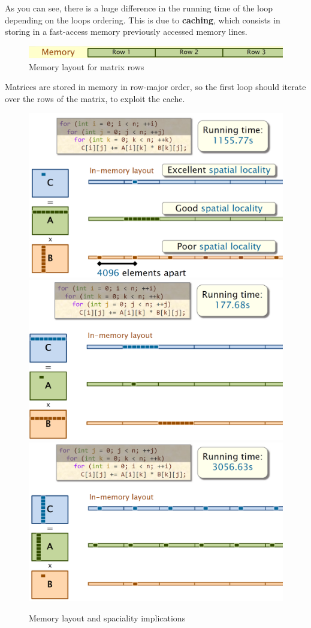 As you can see, there is a huge difference in the running time of the loop depending on the loops ordering. This is due to \textbf{caching}, which consists in storing in a fast-access memory previously accessed memory lines.

\newpage
\begin{figure}[htbp]
   \centering
   \includegraphics{images/02/rowmajor.png}
   \caption{Memory layout for matrix rows}
   \label{fig:rowmajor}
\end{figure}
Matrices are stored in memory in row-major order, so the first loop should iterate over the rows of the matrix, to exploit the cache.

\begin{figure}[htbp]
   \centering
   \includegraphics[width=0.49\columnwidth]{images/02/memory_layout1.png}
   \includegraphics[width=0.49\columnwidth]{images/02/memory_layout2.png}\\
   \includegraphics[width=0.49\columnwidth]{images/02/memory_layout3.png}
   \caption{Memory layout and spaciality implications}
   \label{fig:spaciality}
\end{figure}

